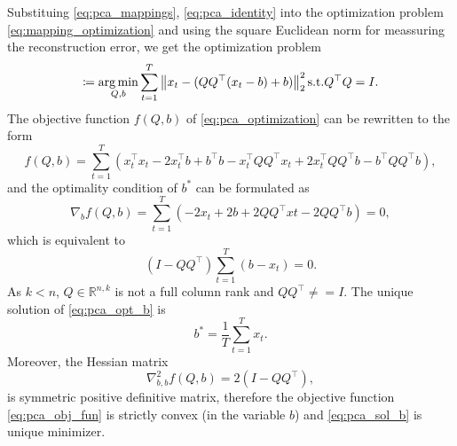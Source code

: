 Substituing \eqref{eq:pca_mappings}, \eqref{eq:pca_identity} into the optimization problem \eqref{eq:mapping_optimization} and using the square Euclidean norm for meassuring the reconstruction error, we get the optimization problem
\begin{equation}
    [Q^{*}, b^{*}] \coloneqq \argmin_{Q,b} \sum_{t=1}^T \norm{x_t - (QQ^{\top}(x_t-b) + b)}^2_2 \text{s.t.} Q^{\top}Q=I.
    \label{eq:pca_optimization}
\end{equation}
The objective function $f(Q,b)$ of \eqref{eq:pca_optimization} can be rewritten to the form
\begin{equation}
    f(Q,b)=\sum_{t=1}^T (x_t^{\top}x_t - 2 x_t^{\top}b + b^{\top}b - x_t^{\top}QQ^{\top}x_t + 2x_t^{\top}QQ^{\top}b - b^{\top}QQ^{\top}b),
    \label{eq:pca_obj_fun}
\end{equation}
and the optimality condition of $b^{*}$ can be formulated as
\begin{equation}
    \nabla_bf(Q,b) = \sum_{t=1}^T(-2x_t+2b+2QQ^{\top}xt-2QQ^{\top}b)=0,
\end{equation}
which is equivalent to
\begin{equation}
    (I-QQ^{\top})\sum_{t=1}^T(b-x_t)=0.
    \label{eq:pca_opt_b}
\end{equation}
As $k<n$, $Q \in \mathbb{R}^{n,k}$ is not a full column rank and $QQ^{\top} \neq = I$. The unique solution of \eqref{eq:pca_opt_b} is
\begin{equation}
    b^{*} = \frac{1}{T}\sum_{t=1}^T x_t.
\end{equation}
Moreover, the Hessian matrix
\begin{equation}
    \nabla_{b,b}^2 f(Q,b)=2(I-QQ^{\top}),
    \label{eq:pca_sol_b}
\end{equation}
is symmetric positive definitive matrix, therefore the objective function \eqref{eq:pca_obj_fun} is strictly convex (in the variable $b$) and \eqref{eq:pca_sol_b} is unique minimizer.

